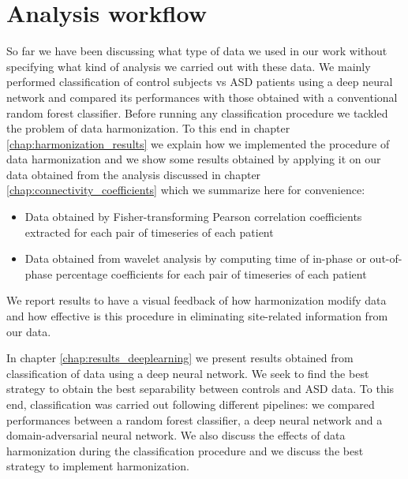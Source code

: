 \documentclass[11pt]{report}
\begin{document}
\newpage





\chapter{Analysis workflow}\label{sec:analysis_workflow}
So far we have been discussing what type of data we used in our work without specifying what kind of analysis we carried out with these data.
We mainly performed classification of control subjects vs ASD patients using a deep neural network and compared its performances with those obtained with a conventional random forest classifier.
Before running any classification procedure we tackled the problem of data harmonization.
To this end in chapter \ref{chap:harmonization_results} we explain how we implemented the procedure of data harmonization and we show some results obtained by applying it on our data obtained from the analysis discussed in chapter \ref{chap:connectivity_coefficients} which we summarize here for convenience:
\begin{itemize}
\item Data obtained by Fisher-transforming Pearson correlation coefficients extracted for each pair of timeseries of each patient
\item Data obtained from wavelet analysis by computing time of in-phase or out-of-phase percentage coefficients for each pair of timeseries of each patient
\end{itemize}
We report results to have a visual feedback of how harmonization modify data and how effective is this procedure in eliminating site-related information from our data.

In chapter \ref{chap:results_deeplearning} we present results obtained from classification of data using a deep neural network. We seek to find the best strategy to obtain the best separability between controls and ASD data.
To this end, classification was carried out following different pipelines: we compared performances between a random forest classifier, a deep neural network and a domain-adversarial neural network. We also discuss the effects of data harmonization during the classification procedure and we discuss the best strategy to implement harmonization.
\end{document}
